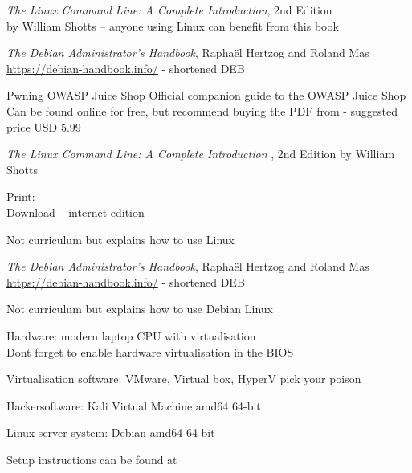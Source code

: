 \documentclass[Screen16to9,17pt]{foils}
\begin{document}
 \begin{list2}
\item \emph{The Linux Command Line: A Complete Introduction}, 2nd Edition\\
 by William Shotts -- anyone using Linux can benefit from this book
 \item \emph{The Debian Administrator’s Handbook}, Raphaël Hertzog and Roland Mas\\
 \url{https://debian-handbook.info/} - shortened DEB
\item Pwning OWASP Juice Shop Official companion guide to the OWASP Juice Shop
Can be found online for free, but recommend buying the PDF from  - suggested price USD 5.99
 \end{list2}




\emph{The Linux Command Line: A Complete Introduction }, 2nd Edition
by William Shotts

Print: \\
Download -- internet edition 


Not curriculum but explains how to use Linux




\emph{The Debian Administrator’s Handbook}, Raphaël Hertzog and Roland Mas\\
\url{https://debian-handbook.info/} - shortened DEB

Not curriculum but explains how to use Debian Linux




\begin{list2}
\item Hardware: modern laptop CPU with virtualisation\\
Dont forget to enable hardware virtualisation in the BIOS
\item Virtualisation software: VMware, Virtual box, HyperV pick your poison
\item Hackersoftware: Kali Virtual Machine amd64 64-bit 
\item Linux server system: Debian amd64 64-bit 
\item Setup instructions can be found at 
\end{list2}
\end{document}
